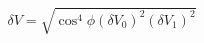\begin{equation}
\label{eq:delta_V_Malus}
\delta V = \sqrt{ \cos^4{\phi}(\delta V_0)^2 (\delta V_1)^2}
\end{equation}